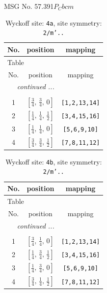 \documentclass[fleqn,8pt]{jsarticle}
\begin{document}
\setcounter{MaxMatrixCols}{32}

\renewcommand{\tablename}{Table~}
\renewcommand{\figurename}{Figure~}
\begin{center}
\LARGE
MSG No. 57.391\quad$P_{C}bcm$
\end{center}
\renewcommand{\arraystretch}{1.2}
\begin{longtable}{ccc}
\caption{Wyckoff site: {\tt 4a}, site symmetry: {\tt 2/m'..}}
 \\
 \hline \hline
No. & position & mapping \\ \hline \endfirsthead

\multicolumn{2}{l}{\tablename\ \thetable{}} \\
 \hline \hline
No. & position & mapping \\ \hline \endhead

 \hline \hline
\multicolumn{2}{r}{\footnotesize\it continued ...} \\ \endfoot

 \hline \hline
\multicolumn{2}{r}{} \\ \endlastfoot

1 & $\left[ \frac{3}{4},\, \frac{3}{4},\, 0 \right]$ & {\tt [1,2,13,14]} \\ \hline
2 & $\left[ \frac{1}{4},\, \frac{1}{4},\, \frac{1}{2} \right]$ & {\tt [3,4,15,16]} \\ \hline
3 & $\left[ \frac{1}{4},\, \frac{1}{4},\, 0 \right]$ & {\tt [5,6,9,10]} \\ \hline
4 & $\left[ \frac{3}{4},\, \frac{3}{4},\, \frac{1}{2} \right]$ & {\tt [7,8,11,12]} \\
\end{longtable}
\renewcommand{\arraystretch}{1.2}
\begin{longtable}{ccc}
\caption{Wyckoff site: {\tt 4b}, site symmetry: {\tt 2/m'..}}
 \\
 \hline \hline
No. & position & mapping \\ \hline \endfirsthead

\multicolumn{2}{l}{\tablename\ \thetable{}} \\
 \hline \hline
No. & position & mapping \\ \hline \endhead

 \hline \hline
\multicolumn{2}{r}{\footnotesize\it continued ...} \\ \endfoot

 \hline \hline
\multicolumn{2}{r}{} \\ \endlastfoot

1 & $\left[ \frac{3}{4},\, \frac{1}{4},\, 0 \right]$ & {\tt [1,2,13,14]} \\ \hline
2 & $\left[ \frac{1}{4},\, \frac{3}{4},\, \frac{1}{2} \right]$ & {\tt [3,4,15,16]} \\ \hline
3 & $\left[ \frac{1}{4},\, \frac{3}{4},\, 0 \right]$ & {\tt [5,6,9,10]} \\ \hline
4 & $\left[ \frac{3}{4},\, \frac{1}{4},\, \frac{1}{2} \right]$ & {\tt [7,8,11,12]} \\
\end{longtable}
\end{document}
